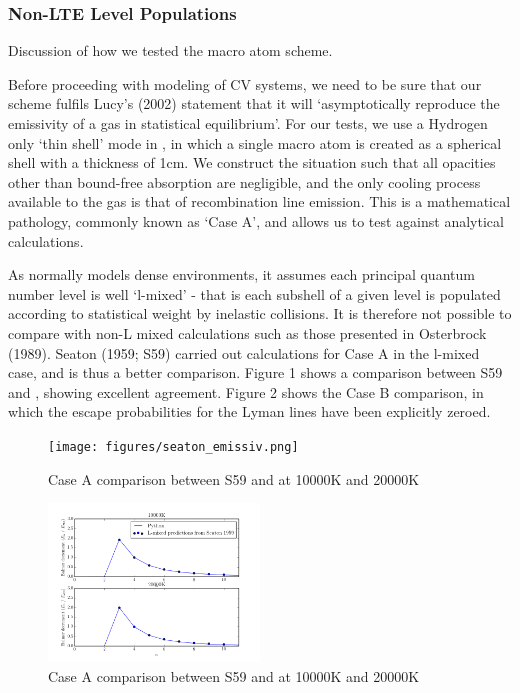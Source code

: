 \documentclass[useAMS,usenatbib, onecolumn]{mn2ejm}
\begin{document}
\subsubsection{Non-LTE Level Populations}

Discussion of how we tested the macro atom scheme.

Before proceeding with modeling of CV systems, we need to be sure that our scheme fulfils Lucy's (2002) 
statement that it will `asymptotically reproduce the emissivity of a gas in statistical equilibrium'.
For our tests, we use a Hydrogen only `thin shell' mode in \py, in which a single macro atom is created as a spherical 
shell with a thickness of 1cm. We construct the situation such that all opacities other than 
bound-free absorption are negligible, and the only cooling process available to the gas is that of
recombination line emission. This is a mathematical pathology, commonly known as `Case A', and allows
us to test against analytical calculations.

As \py normally models dense environments, it assumes each principal quantum number level is
well `l-mixed' - that is each subshell of a given level is populated according to statistical weight by
inelastic collisions. It is therefore not possible to compare with non-L mixed calculations such as 
those presented in Osterbrock (1989\nocite{oster}). Seaton (1959; S59\nocite{seaton}) carried out calculations
for Case A in the l-mixed case, and is thus a better comparison. Figure 1 shows a comparison between S59
and \py, showing excellent agreement. Figure 2 shows the Case B comparison, in which the escape probabilities
for the Lyman lines have been explicitly zeroed.

\begin{figure}
\centering
\texttt{[image: figures/seaton\_emissiv.png]}
\caption{Case A comparison between S59 and \py at 10000K and 20000K}
\label{seaton}
\end{figure}

\begin{figure}
\includegraphics[width=0.5\textwidth]{figures/caseA.png}
\caption{Case A comparison between S59 and \py at 10000K and 20000K}
\end{figure}
\end{document}
